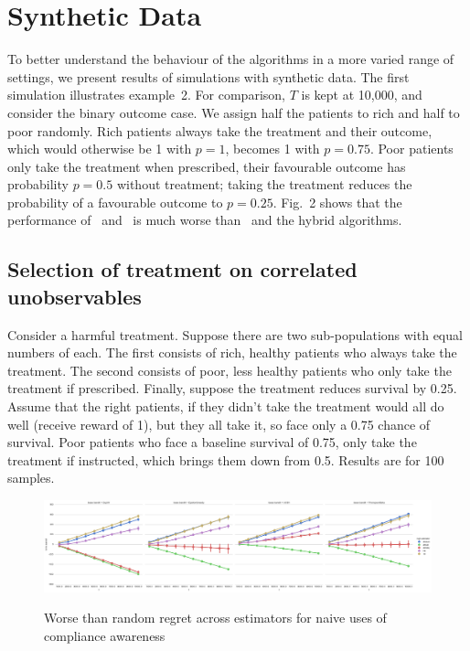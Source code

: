 \section{Synthetic Data}


To better understand the behaviour of the algorithms in a more varied range of settings, we present results of simulations with synthetic data.
The first simulation illustrates example~2. For comparison, $T$ is kept at 10,000, and consider the binary outcome case. We assign half the patients to rich and half to poor randomly. Rich patients always take the treatment and their outcome, which would otherwise be 1 with $p=1$, becomes 1 with  $p=0.75$. Poor patients only take the treatment when prescribed, their favourable outcome has probability $p=0.5$ without treatment; taking the treatment reduces the probability of a favourable outcome to $p=0.25$. Fig.~2 shows that the performance of \actual\, and \comply\, is much worse than \chosen\, and the hybrid algorithms.

\subsection{Selection of treatment on correlated unobservables}

Consider a harmful treatment. Suppose there are two sub-populations with equal numbers of each. The first consists of rich, healthy patients who always take the treatment. The second consists of poor, less healthy patients who only take the treatment if prescribed. Finally, suppose the treatment reduces survival by 0.25. Assume that the right patients, if they didn't take the treatment would all do well (receive reward of 1), but they all take it, so face only a 0.75 chance of survival. Poor patients who face a baseline survival of 0.75, only take the treatment if instructed, which brings them down from 0.5. Results are for 100 samples.

%

%


\begin{figure}
	\centering	
	\includegraphics[width=1\textwidth, angle=90]{bandit/figs/ex2.png}\hspace{1cm}
	\label{fig:ex2}
	\caption{Worse than random regret across estimators for naive uses of compliance awareness}
\end{figure}



